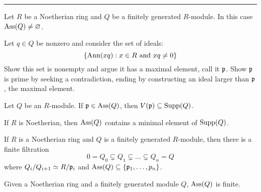 \documentclass{ximera}
\begin{document}
\hrule


\begin{proposition}
  Let $R$ be a Noetherian ring and $Q$ be a finitely generated
  $R$-module. In this case $\operatorname{Ass}(Q) \ne \varnothing$.
  \begin{sketch}
    Let $q\in Q$ be nonzero and consider the set of ideals:
    \[
    \{\operatorname{Ann}(xq): x\in R\text{ and }xq\ne 0 \}
    \]
    Show this set is nonempty and argue it has a maximal element, call
    it $\mathfrak{p}$. Show $\mathfrak{p}$ is prime by seeking a contradiction, ending by
    constructing an ideal larger than $\mathfrak{p}$, the maximal element.
  \end{sketch}
\end{proposition}


\begin{proposition}
  Let $Q$ be an $R$-module. If $\mathfrak{p}\in\operatorname{Ass}(Q)$, then $V(\mathfrak{p})\subseteq
  \operatorname{Supp}(Q)$.
  \begin{sketch}
    
  \end{sketch}
\end{proposition}

\begin{proposition}
  If $R$ is Noetherian, then $\operatorname{Ass}(Q)$ contains a minimal element of
  $\operatorname{Supp}(Q)$.
\end{proposition}


\begin{proposition}
  If $R$ is a Noetherian ring and $Q$ is a finitely generated
  $R$-module, then there is a finite filtration
  \[
  0 = Q_0 \subsetneq Q_1 \subsetneq \dots \subsetneq Q_n = Q 
  \]
  where $Q_i/Q_{i+1} \simeq R/\mathfrak{p}_i$ and $\operatorname{Ass}(Q) \subseteq
  \{\mathfrak{p}_1,\dots,p_n\}$.
\end{proposition}

\begin{corollary}
  Given a Noetherian ring and a finitely generated module $Q$,
  $\operatorname{Ass}(Q)$ is finite.
\end{corollary}
\end{document}
